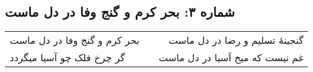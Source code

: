 \begin{center}
\section*{شماره ۳: بحر کرم و گنج وفا در دل ماست}
\label{sec:003}
\begin{longtable}{l p{0.5cm} r}
بحر کرم و گنج وفا در دل ماست
&&
گنجینهٔ تسلیم و رضا در دل ماست
\\
گر چرخ فلک چو آسیا میگردد
&&
غم نیست که میخ آسیا در دل ماست
\\
\end{longtable}
\end{center}
